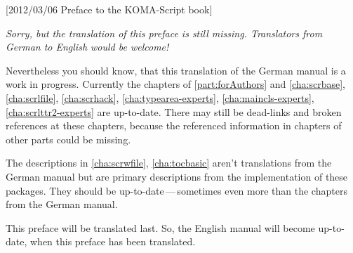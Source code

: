 %
%
%
%
%
%
%
%
%

[2012/03/06 Preface to the KOMA-Script book]



\emph{Sorry, but the translation of this preface is still missing. Translators
  from German to English would be welcome!}

Nevertheless you should know, that this translation of the German
\KOMAScript{} manual is a work in progress. Currently the chapters of
\autoref{part:forAuthors} and \autoref{cha:scrbase}, \autoref{cha:scrlfile},
\autoref{cha:scrhack}, \autoref{cha:typearea-experts},
\autoref{cha:maincls-experts}, \autoref{cha:scrlttr2-experts} are
up-to-date. There may still be dead-links and broken references at these
chapters, because the referenced information in chapters of other parts could
be missing.

The descriptions in \autoref{cha:scrwfile}, \autoref{cha:tocbasic} aren't
translations from the German manual but are primary descriptions from the
implementation of these packages. They should be up-to-date\,---\,sometimes
even more than the chapters from the German manual.

This preface will be translated last. So, the English manual will become
up-to-date, when this preface has been translated.

\endinput



